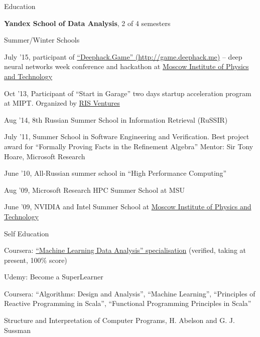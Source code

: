 \documentclass{resume} %
\begin{document}
\begin{rSection}{Education}

\textbf{Yandex School of Data Analysis}, 2 of 4 semesters


\begin{rSubsectionSchools}{Summer/Winter Schools}
\item July '15, participant of \href{http://game.deephack.me/}{``Deephack.Game'' 
(http://game.deephack.me)} -- deep neural
networks week conference and hackathon at \href{http://mipt.ru/}{Moscow Institute of Physics and 
Technology}
\item Oct '13, Participant of ``Start in Garage'' two days startup acceleration program at
MIPT. Organized by \href{http://www.risventures.com/}{RIS Ventures}
\item Aug '14, 8th Russian Summer School in Information Retrieval (RuSSIR)
\item July '11, Summer School in Software Engineering and Verification. Best project award for
``Formally Proving Facts in the Refinement Algebra'' Mentor: Sir Tony Hoare, Microsoft Research
\item June '10, All-Russian summer school in ``High Performance Computing''
\item Aug '09, Microsoft Research HPC Summer School at MSU
\item June '09, NVIDIA and Intel Summer School at \href{http://mipt.ru/}{Moscow Institute of 
Physics and 
Technology}
\end{rSubsectionSchools}


\begin{rSubsectionSchools}{Self Education}
\item Coursera:
\href{https://www.coursera.org/specializations/machine-learning-data-analysis}{``Machine Learning
Data Analysis'' specialisation} (verified, taking at present, 100\% score)
\item Udemy: Become a SuperLearner
\item Coursera: ``Algorithms: Design and Analysis'', ``Machine Learning'', ``Principles of Reactive
Programming in Scala'', ``Functional Programming Principles in Scala''
\item Structure and Interpretation of Computer Programs, H. Abelson and G. J. Sussman
\end{rSubsectionSchools}

\end{rSection}
\end{document}
